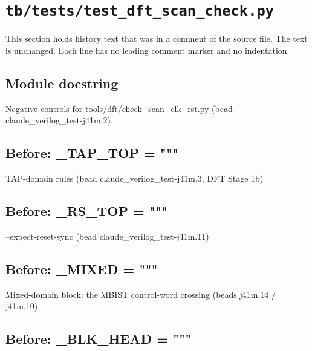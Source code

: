 \section{\texttt{tb/tests/test\_dft\_scan\_check.py}}\label{cr:suite:test-dft-scan-check}

This section holds history text that was in a comment of the source file. The text is unchanged. Each line has no leading comment marker and no indentation.

\begin{record}

\subsection*{Module docstring}

\begin{textblock}
Negative controls for tools/dft/check_scan_clk_rst.py (bead claude_verilog_test-j41m.2).
\end{textblock}

\subsection*{Before: \_TAP\_TOP = """}

\begin{textblock}
TAP-domain rules (bead claude_verilog_test-j41m.3, DFT Stage 1b)
\end{textblock}

\subsection*{Before: \_RS\_TOP = """}

\begin{textblock}
--expect-reset-sync (bead claude_verilog_test-j41m.11)
\end{textblock}

\subsection*{Before: \_MIXED = """}

\begin{textblock}
Mixed-domain block: the MBIST control-word crossing (beads j41m.14 / j41m.10)
\end{textblock}

\subsection*{Before: \_BLK\_HEAD = """}


\end{record}
